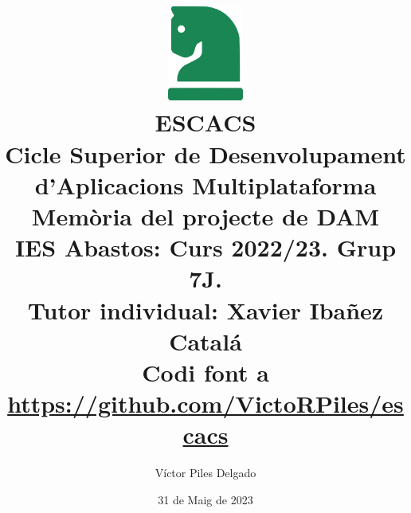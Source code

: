 \documentclass[12pt]{report}
\title{
    \includegraphics[width=25mm]{images/knight-green.png}
    \\[5mm]
    \textbf{ESCACS}
    \\[5mm]
    \normalsize Cicle Superior de Desenvolupament d'Aplicacions Multiplataforma
    \\[5mm]
    \normalsize Memòria del projecte de DAM
    \\[5mm]
    \normalsize IES Abastos: Curs 2022/23. Grup 7J.
    \\[5mm]
    \normalsize Tutor individual: Xavier Ibañez Catalá
    \\[5mm]
    \normalsize Codi font a 
    \href{https://github.com/VictoRPiles/escacs}{https://github.com/VictoRPiles/escacs}
    \\[10mm]
}
\author{Víctor Piles Delgado}
\date{31 de Maig de 2023}
\begin{document}
\emergencystretch 2cm
\maketitle
\tableofcontents
\listoffigures




\begin{multicols}{2}
    
    \nocite{*}
    
\end{multicols}
\end{document}
